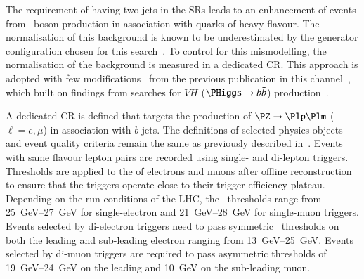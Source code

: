 The requirement of having two \btagged jets in the SRs leads to an enhancement
of events from \PZ~boson production in association with quarks of heavy
flavour. The normalisation of this background is known to be underestimated by
the generator configuration chosen for this search~\cite{STDM-2017-38}. To
control for this mismodelling, the normalisation of the \ZHF background is
measured in a dedicated CR.
This approach is adopted with few modifications~\cite{bokan} from the previous
publication in this channel~\cite{HIGG-2016-16-witherratum}, which built on
findings from searches for $VH$ ($\PHiggs \to \bbbar$)
production~\cite{HIGG-2016-29}.

A dedicated CR is defined that targets the production of $\PZ \ra \Plp\Plm$
($\ell = e , \mu$) in association with $b$-jets. The definitions of selected
physics objects and event quality criteria remain the same as previously
described in~. Events with
same flavour lepton pairs are recorded using single- and di-lepton
triggers. Thresholds are applied to the \pT of electrons and muons after offline
reconstruction to ensure that the triggers operate close to their trigger
efficiency plateau. Depending on the run conditions of the LHC, the
\pT~thresholds range from \SIrange{25}{27}{\GeV} for single-electron and
\SIrange{21}{28}{\GeV} for single-muon triggers. Events selected by di-electron
triggers need to pass symmetric \pT~thresholds on both the leading and
sub-leading electron ranging from \SIrange{13}{25}{\GeV}. Events selected by
di-muon triggers are required to pass asymmetric thresholds of
\SIrange{19}{24}{\GeV} on the leading and \SI{10}{\GeV} on the sub-leading muon.

